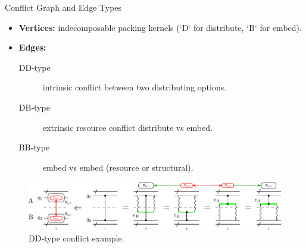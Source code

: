 \documentclass{beamer}
\begin{document}
	
	
	\begin{frame}{Conflict Graph and Edge Types}
		\begin{itemize}
			\item \textbf{Vertices:} indecomposable packing kernels (`D` for distribute, `B` for embed).
			\item \textbf{Edges:}
			\begin{description}
				\item[DD‑type] intrinsic conflict between two distributing options.
				\item[DB‑type] extrinsic resource conflict distribute vs embed.
				\item[BB‑type] embed vs embed (resource or structural).
			\end{description}
		\end{itemize}
		\begin{figure}
			\includegraphics[width=.9\linewidth]{figures/conflict_DD_intrinsic.pdf}
			\caption{DD‑type conflict example.}
		\end{figure}
	\end{frame}
	
\end{document}
